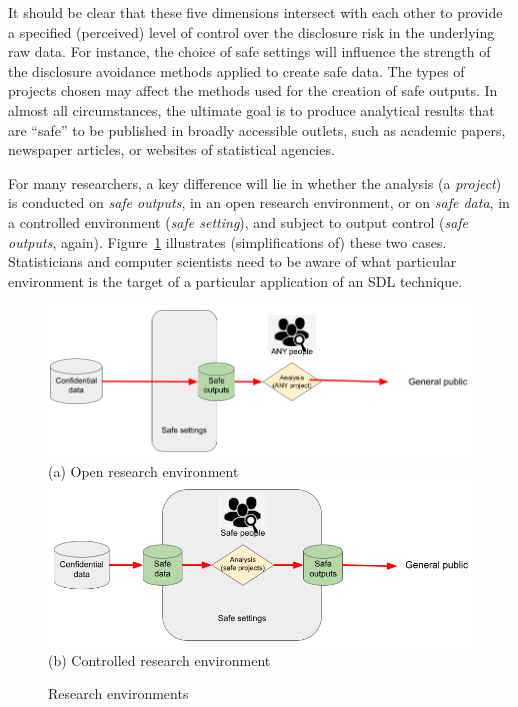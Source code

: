 It should be clear that these five dimensions intersect with each other to provide a specified (perceived) level of control over the disclosure risk in the underlying raw data. For instance, the choice of safe settings will influence the strength of the disclosure avoidance methods applied to create safe data. The types of projects chosen may affect the methods used for the creation of safe outputs. In almost all circumstances, the ultimate goal is to produce analytical results that are  ``safe'' to be published in broadly accessible outlets, such as academic papers, newspaper articles, or websites of statistical agencies. 

For many researchers, a key difference will lie in whether the analysis (a \textit{project}) is conducted on \textit{safe outputs}, in an open research environment, or on \textit{safe data}, in a controlled environment (\textit{safe setting}), and subject to output control (\textit{safe outputs}, again). Figure~\ref{fig:research_environments} illustrates (simplifications of) these two cases. Statisticians and computer scientists need to be aware of what particular environment is the target of a particular application of an \ac{SDL} technique. 


\begin{figure}
    \centering
        \includegraphics[width=1\textwidth]{research-environment-1.png} \\
        (a) Open research environment\\
        
        \includegraphics[width=1\textwidth]{research-environment-2.png}\\
         (b) Controlled research environment

    
    \caption{Research environments}
    \label{fig:research_environments}
\end{figure}

